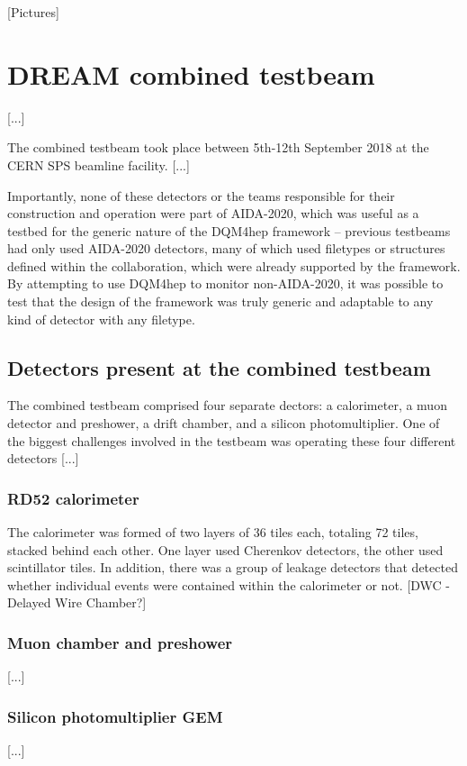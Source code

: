 [Pictures]

\section{DREAM combined testbeam}
[...]

The combined testbeam took place between 5th-12th September 2018 at the CERN SPS beamline facility. [...]

Importantly, none of these detectors or the teams responsible for their construction and operation were part of AIDA-2020, which was useful as a testbed for the generic nature of the DQM4hep framework -- previous testbeams had only used AIDA-2020 detectors, many of which used filetypes or structures defined within the collaboration, which were already supported by the framework. By attempting to use DQM4hep to monitor non-AIDA-2020, it was possible to test that the design of the framework was truly generic and adaptable to any kind of detector with any filetype.

\subsection{Detectors present at the combined testbeam}
The combined testbeam comprised four separate dectors: a calorimeter, a muon detector and preshower, a drift chamber, and a silicon photomultiplier. One of the biggest challenges involved in the testbeam was operating these four different detectors [...]

\subsubsection{RD52 calorimeter}
The calorimeter was formed of two layers of 36 tiles each, totaling 72 tiles, stacked behind each other. One layer used Cherenkov detectors, the other used scintillator tiles. In addition, there was a group of leakage detectors that detected whether individual events were contained within the calorimeter or not. [DWC - Delayed Wire Chamber?]

\subsubsection{Muon chamber and preshower}
[...]

\subsubsection{Silicon photomultiplier GEM}
[...]

